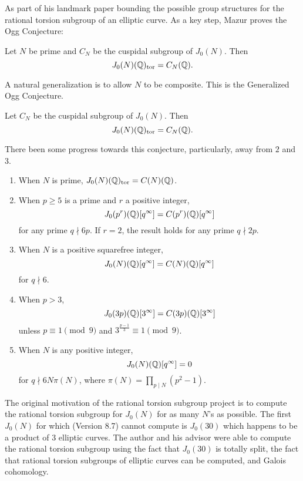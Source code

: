 As part of his landmark paper bounding the possible group structures for the
rational torsion subgroup of an elliptic curve. As a key step, Mazur proves the
Ogg Conjecture:
\begin{theorem}
    Let $N$ be prime and $C_N$ be the cuspidal subgroup of $J_0(N)$. Then
    \[
        J_0(N)(\mathbb{Q})_{\mathrm{tor}} = C_N(\mathbb{Q}).
    \]
\end{theorem}
A natural generalization is to allow $N$ to be composite. This is the
Generalized Ogg Conjecture.
\begin{conjecture}
    Let $C_N$ be the cuspidal subgroup of $J_0(N)$. Then
    \[
        J_0(N)(\mathbb{Q})_{\mathrm{tor}} = C_N(\mathbb{Q}).
    \]
\end{conjecture}
There been some progress towards this conjecture, particularly, away from $2$
and $3$.
\begin{enumerate}
    \item 
        When $N$ is prime, $J_0(N)(\mathbb{Q})_{\mathrm{tor}} =C(N)(\mathbb{Q})$.~\cite[Thm.
        1]{mazur:eisenstein}
    \item
        When $p\geq 5$ is a prime and $r$ a positive integer,
        \[
            J_0(p^r)(\mathbb{Q})[q^\infty] = C(p^r)(\mathbb{Q})[q^\infty]
        \]
        for any prime $q\nmid 6p$. If $r=2$, the result holds for any prime
        $q\nmid 2p$.~\cite[Thm. 4]{ling:cuspidal_pr}
    \item
        When $N$ is a positive squarefree integer,
        \[
            J_0(N)(\mathbb{Q})[q^\infty]=C(N)(\mathbb{Q})[q^\infty]
        \]
        for $q\nmid 6$.~\cite[Thm. 3.6.2]{ohta:rational_torsion_2}
    \item
        When $p>3$,
        \[
            J_0(3p)(\mathbb{Q})[3^\infty] = C(3p)(\mathbb{Q})[3^\infty]
        \]
        unless $p\equiv 1 \pmod{9}$ and $3^{\frac{p-1}{3}} \equiv 1
        \pmod{9}$.~\cite{yoo:rational}
    \item
        When $N$ is any positive integer,
        \[
            J_0(N)(\mathbb{Q})[q^\infty]=0
        \]
        for $q\nmid 6N\pi(N)$, where $\pi(N) = \prod_{p\mid N}
        (p^2-1)$.~\cite[Thm. 1.2]{ren:rational}
\end{enumerate}

The original motivation of the rational torsion subgroup project is to compute
the rational torsion subgroup for $J_0(N)$ for as many $N$'s as possible. The
first $J_0(N)$ for which \Sage (Version 8.7) cannot compute is $J_0(30)$ which
happens to be a product of 3 elliptic curves. The author and his advisor were
able to compute the rational torsion subgroup using the fact that $J_0(30)$ is
totally split, the fact that rational torsion subgroups of elliptic curves can
be computed, and Galois cohomology.

